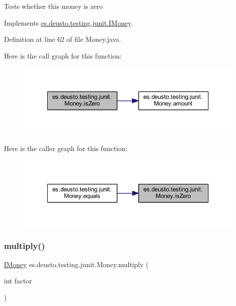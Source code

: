 Tests whether this money is zero 

Implements \mbox{\hyperlink{interfacees_1_1deusto_1_1testing_1_1junit_1_1_i_money_a166c39b6f931e49769580a04f8c73500}{es.\+deusto.\+testing.\+junit.\+I\+Money}}.



Definition at line 62 of file Money.\+java.

Here is the call graph for this function\+:
\nopagebreak
\begin{figure}[H]
\begin{center}
\leavevmode
\includegraphics[width=348pt]{classes_1_1deusto_1_1testing_1_1junit_1_1_money_a797658a03260b535e9a36ebbcc3b19c9_cgraph}
\end{center}
\end{figure}
Here is the caller graph for this function\+:
\nopagebreak
\begin{figure}[H]
\begin{center}
\leavevmode
\includegraphics[width=348pt]{classes_1_1deusto_1_1testing_1_1junit_1_1_money_a797658a03260b535e9a36ebbcc3b19c9_icgraph}
\end{center}
\end{figure}
\mbox{\label{classes_1_1deusto_1_1testing_1_1junit_1_1_money_a02c7d4e9013710f70d1d46e9c9ebae88}} 
\subsubsection{\texorpdfstring{multiply()}{multiply()}}
{\footnotesize\ttfamily \mbox{\hyperlink{interfacees_1_1deusto_1_1testing_1_1junit_1_1_i_money}{I\+Money}} es.\+deusto.\+testing.\+junit.\+Money.\+multiply (\begin{DoxyParamCaption}\item[{int}]{factor }\end{DoxyParamCaption})}

